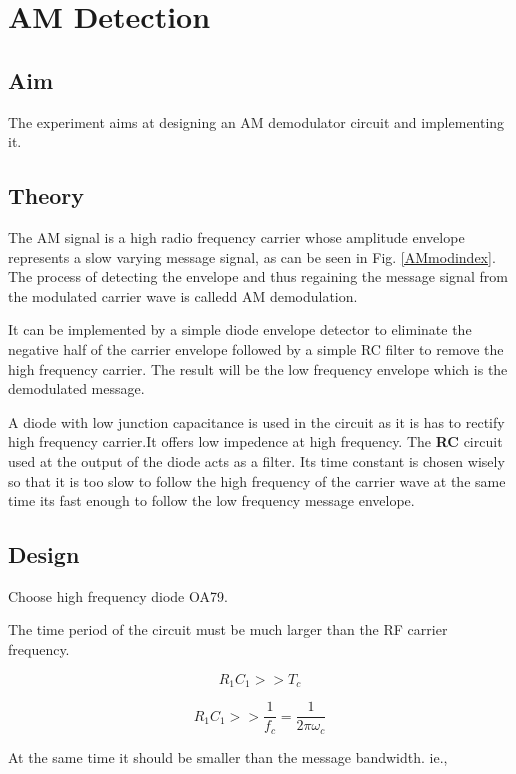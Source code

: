 \chapter[AM Detection]{AM Detection}
\label{AMDetection}
\section*{Aim}
The experiment aims at designing an AM demodulator circuit and implementing it.

\section*{Theory}
The AM signal is a high radio frequency carrier whose amplitude envelope represents a slow varying message signal, as can be seen in Fig. \ref{AMmodindex}. The process of detecting the envelope and thus regaining the message signal from the modulated carrier wave is calledd AM demodulation.

It can be implemented by a simple diode envelope detector to eliminate the negative half of the carrier envelope followed by a simple RC filter to remove the high frequency carrier. The result will be the low frequency envelope which is the demodulated message.

A diode with low junction capacitance is used in the circuit as it is has to rectify high frequency carrier.It offers low impedence at high frequency. The \textbf{RC} circuit used at the output of the diode acts as a filter. Its time constant is chosen wisely so that it is too slow to follow the high frequency of the carrier wave at the same time its fast enough to follow the low frequency message envelope. 


\section*{Design}
Choose high frequency diode OA79.

\noindent The time period of the circuit must be much larger than the RF carrier frequency.

\begin{equation}
R_1C_1 >> T_c
\end{equation}

\begin{equation}
R_1C_1 >> \frac{1}{f_c} = \frac{1}{2\pi\omega_c}
\end{equation}

\noindent At the same time it should be smaller than the message bandwidth. ie.,

